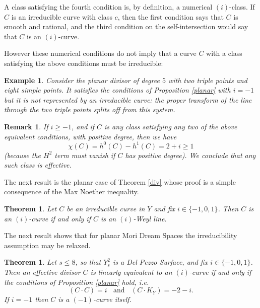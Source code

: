 \documentclass[12pt]{article}
\newtheorem{theorem}[equation]{Theorem}
\newtheorem{remark}[equation]{Remark}
\newtheorem{example}[equation]{Example}
\numberwithin{equation}{section}
\numberwithin{subeq}{equation}
\begin{document}
A class satisfying the fourth condition is, by definition, a numerical $(i)$-class.
If $C$ is an irreducible curve with class $c$,
then the first condition says that $C$ is smooth and rational,
and the third condition on the self-intersection would say that $C$ is an $(i)$-curve.

However these numerical conditions do not imply that a curve $C$
with a class satisfying the above conditions must be irreducible:
\begin{example}\label{exp}
Consider the planar divisor of degree $5$ with two triple points and eight simple points.
It satisfies the conditions of Proposition \eqref{planar} with $i= -1$
but it is not represented by an irreducible curve:
the proper transform of the line through the two triple points splits off from this system.
\end{example}



\begin{remark}
If $i\geq -1$, and if $C$ is any class satisfying any two of the above equivalent conditions,
with positive degree, then we have 
\[
\chi(C)=h^0(C)-h^1(C)=2+i\geq 1
\]
(because the $H^2$ term must vanish if $C$ has positive degree).
We conclude that any such class is effective.
\end{remark}



The next result is the planar case of Theorem \ref{div} whose proof is a simple consequence of the Max Noether inequality.

\begin{theorem}\label{Y2sirreducible}
Let $C$ be an irreducible curve in $Y$ and fix $i\in \{-1,0,1\}$.
Then $C$ is an $(i)$-curve if and only if $C$ is an $(i)$-Weyl line.
\end{theorem}

The next result shows that for planar Mori Dream Spaces
the irreducibility assumption may be relaxed.

\begin{theorem}\label{thm1}
Let $s \leq 8$, so that $Y^2_s$ is a Del Pezzo Surface, and fix $i\in \{-1,0,1\}$.
Then an effective divisor $C$ is linearly equivalent to an $(i)$-curve if and only if the conditions of Proposition \ref{planar} hold, i.e.
\begin{equation}\label{equa2}
(C \cdot C) =i \;\;\text{ and } \;\; (C \cdot K_Y) = -2-i.
\end{equation}
If $i=-1$ then $C$ is a $(-1)$-curve itself.
\end{theorem}
\end{document}
